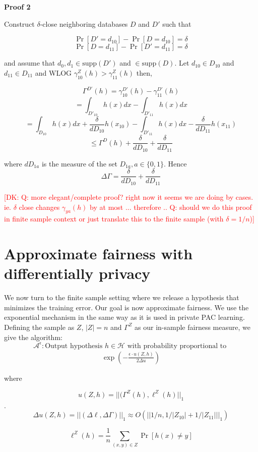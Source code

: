 \documentclass[format = sigconf]{acmart}
\newcommand{\dk}[1]{\textcolor{red}{[DK: #1]}}
\newcommand{\1}{\mathbbm{1}}
\theoremstyle{definition}
\begin{document}
{\bf Proof 2}

Construct $\delta$-close neighboring databases $D$ and $D'$ such that

$$\Pr[D'=d_{10}] - \Pr[D=d_{10}] = \delta$$
$$\Pr[D=d_{11}] - \Pr[D'=d_{11}] = \delta$$



and assume that $d_0, d_1 \in \text{supp}(D')$ and $\in \text{supp}(D)$. Let $d_{10} \in D_{10}$ and $d_{11} \in D_{11}$ and WLOG $\gamma_{10}^Z(h) > \gamma_{11}^Z(h)$ then,

$$\Gamma^{D'}(h) = \gamma_{10}^{D'}(h) - \gamma_{11}^{D'}(h)$$
$$= \int_{D'_{10}}h(x)dx - \int_{D'_{11}}h(x)dx$$
$$= \int_{D_{10}}h(x)dx + \frac{\delta}{dD_{10}}h(x_{10}) - \int_{D'_{11}}h(x)dx - \frac{\delta}{dD_{11}}h(x_{11})$$
$$\leq \Gamma^{D}(h) + \frac{\delta}{dD_{10}} + \frac{\delta}{dD_{11}}$$

where $dD_{1a}$ is the measure of the set $D_{1a}, a \in \{0,1\}$. Hence
$$\Delta\Gamma = \frac{\delta}{dD_{10}} + \frac{\delta}{dD_{11}}$$

\dk{Q: more elegant/complete proof? right now it seems we are doing by cases. ie. $\delta$ close changes $\gamma_{ya}(h)$ by at most ... therefore ..
Q: should we do this proof in finite sample context or just translate this to the finite sample (with $\delta = 1/n$)}

\section{Approximate fairness with differentially privacy}



We now turn to the finite sample setting where we release a hypothesis that minimizes the training error. Our goal is now approximate fairness. We use the exponential mechanism in the same way as it is used in private PAC learning. Defining the sample as $Z$, $|Z| = n$ and $\Gamma^{Z}$ as our in-sample fairness measure, we give the algorithm:
$$\mathcal{A}^\epsilon : \text{Output hypothesis }h \in \mathcal{H} \text{ with probability proportional to }$$
\begin{align}
\exp(-\frac{\epsilon \cdot u(Z,h)}{2\Delta u})
\end{align}

where

$$u(Z,h) = ||(\Gamma^Z(h), \ell^Z(h)||_{1}$$.
$$\Delta u(Z,h) = ||(\Delta\ell,\Delta{\Gamma})||_1 \approx O(||1/n,1/|Z_{10}|+1/|Z_{11}|||_1)$$

$$\ell^Z(h) = \frac{1}{n} \sum_{(x,y) \in Z}\Pr[h(x) \neq y]$$
\end{document}
